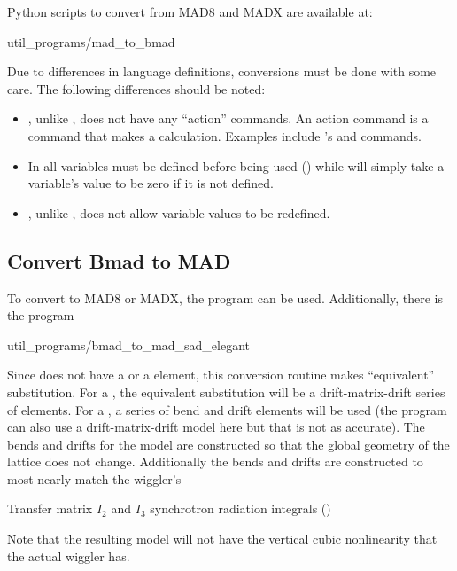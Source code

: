Python scripts to convert from MAD8 and MADX are available at:
\begin{example}
  util_programs/mad_to_bmad
\end{example}
Due to differences in language definitions, conversions must be done with some care. The following
differences should be noted:
  \begin{itemize}
  \item
\bmad, unlike \mad, does not have any ``action'' commands. An action command is a command that makes
a calculation. Examples include \mad's  and  commands.
  \item
In \bmad all variables must be defined before being used () while \mad will simply take
a variable's value to be zero if it is not defined.
  \item
\bmad, unlike \mad, does not allow variable values to be redefined.
  \end{itemize}

\subsection{Convert Bmad to MAD}
\label{s:bmad.mad}

To convert to MAD8 or MADX, the \tao program can be used. Additionally, there is the program
\begin{example}
  util_programs/bmad_to_mad_sad_elegant
\end{example}
Since \mad does not have a  or a
 element, this conversion routine makes ``equivalent'' substitution. For a
, the equivalent substitution will be a drift-matrix-drift series of elements. For a
, a series of bend and drift elements will be used (the program can also use a
drift-matrix-drift model here but that is not as accurate). The bends and drifts for the
 model are constructed so that the global geometry of the lattice does not
change. Additionally the bends and drifts are constructed to most nearly match the wiggler's
\begin{example}
  Transfer matrix
  $I_2$ and $I_3$ synchrotron radiation integrals ()
\end{example}
Note that the resulting model will not have the vertical cubic nonlinearity that the actual wiggler
has.

